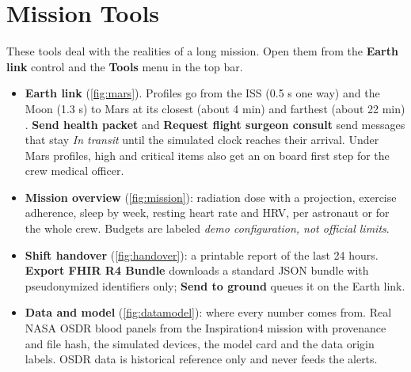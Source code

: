 \section{Mission Tools}
\label{sec:mission-tools}

These tools deal with the realities of a long mission. Open them from the \textbf{Earth link} control and the \textbf{Tools} menu in the top bar.

\begin{itemize}
\item \textbf{Earth link} (\ref{fig:mars}). Profiles go from the ISS (0.5 s one way) and the Moon (1.3 s) to Mars at its closest (about 4 min) and farthest (about 22 min) \cite{nasa_space_communications_seven_things}. \textbf{Send health packet} and \textbf{Request flight surgeon consult} send messages that stay \textit{In transit} until the simulated clock reaches their arrival. Under Mars profiles, high and critical items also get an on board first step for the crew medical officer.
\item \textbf{Mission overview} (\ref{fig:mission}): radiation dose with a projection, exercise adherence, sleep by week, resting heart rate and HRV, per astronaut or for the whole crew. Budgets are labeled \textit{demo configuration, not official limits}.
\item \textbf{Shift handover} (\ref{fig:handover}): a printable report of the last 24 hours. \textbf{Export FHIR R4 Bundle} downloads a standard JSON bundle with pseudonymized identifiers only; \textbf{Send to ground} queues it on the Earth link.
\item \textbf{Data and model} (\ref{fig:datamodel}): where every number comes from. Real NASA OSDR blood panels from the Inspiration4 mission \cite{osdr_osd569,osdr_osd575} with provenance and file hash, the simulated devices, the model card and the data origin labels. OSDR data is historical reference only and never feeds the alerts.
\end{itemize}


